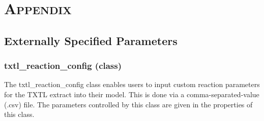 \chapter{\textsc{Appendix}}

	\section{Externally Specified Parameters}
		\subsection*{txtl\_reaction\_config (class)}
		The txtl\_reaction\_config class enables users to input custom reaction parameters for the TXTL extract into their model. This is done via a comma-separated-value (.csv) file. The parameters controlled by this class are given in the properties of this class. 
